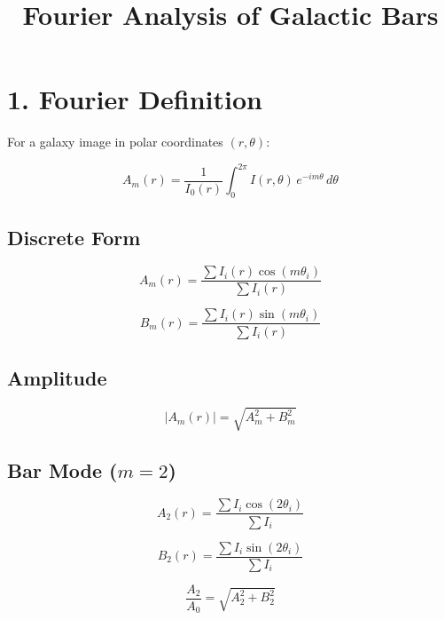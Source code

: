 \documentclass[11pt]{article}
\title{Fourier Analysis of Galactic Bars}
\author{}
\date{}
\begin{document}
\maketitle

\section*{1. Fourier Definition}

For a galaxy image in polar coordinates $(r, \theta)$:

\begin{equation}
A_m(r) = \frac{1}{I_0(r)} \int_0^{2\pi} I(r,\theta)\, e^{-im\theta} \, d\theta
\end{equation}

\subsection*{Discrete Form}

\begin{equation}
A_m(r) = \frac{\sum I_i(r)\cos(m\theta_i)}{\sum I_i(r)}
\end{equation}

\begin{equation}
B_m(r) = \frac{\sum I_i(r)\sin(m\theta_i)}{\sum I_i(r)}
\end{equation}

\subsection*{Amplitude}

\begin{equation}
|A_m(r)| = \sqrt{A_m^2 + B_m^2}
\end{equation}

\subsection*{Bar Mode ($m = 2$)}

\begin{equation}
A_2(r) = \frac{\sum I_i \cos(2\theta_i)}{\sum I_i}
\end{equation}

\begin{equation}
B_2(r) = \frac{\sum I_i \sin(2\theta_i)}{\sum I_i}
\end{equation}

\begin{equation}
\frac{A_2}{A_0} = \sqrt{A_2^2 + B_2^2}
\end{equation}
\end{document}
